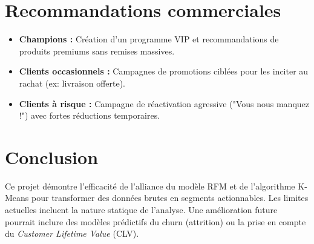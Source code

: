 \documentclass[12pt,a4paper]{article}
\begin{document}
\section{Recommandations commerciales}
\begin{itemize}
    \item \textbf{Champions :} Création d'un programme VIP et recommandations de produits premiums sans remises massives.
    \item \textbf{Clients occasionnels :} Campagnes de promotions ciblées pour les inciter au rachat (ex: livraison offerte).
    \item \textbf{Clients à risque :} Campagne de réactivation agressive ("Vous nous manquez !") avec fortes réductions temporaires.
\end{itemize}

\section{Conclusion}
Ce projet démontre l'efficacité de l'alliance du modèle RFM et de l'algorithme K-Means pour transformer des données brutes en segments actionnables. Les limites actuelles incluent la nature statique de l'analyse. Une amélioration future pourrait inclure des modèles prédictifs du churn (attrition) ou la prise en compte du \textit{Customer Lifetime Value} (CLV).



\end{document}
